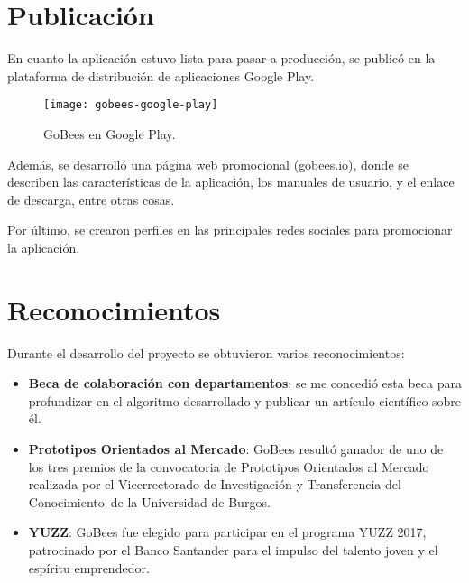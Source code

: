 \section{Publicación}\label{publicacion}

En cuanto la aplicación estuvo lista para pasar a producción, se publicó
en la plataforma de distribución de aplicaciones Google Play.

\begin{figure}[H]
		\centering
	\texttt{[image: gobees-google-play]}
	\caption{GoBees en Google Play.}\label{fig:gobees-google-play}
\end{figure}

Además, se desarrolló una página web promocional
(\href{http://gobees.io/}{gobees.io}), donde se describen las
características de la aplicación, los manuales de usuario, y el enlace
de descarga, entre otras cosas.

Por último, se crearon perfiles en las principales redes sociales para
promocionar la aplicación.

\section{Reconocimientos}\label{reconocimientos}

Durante el desarrollo del proyecto se obtuvieron varios reconocimientos:

\begin{itemize}
\tightlist
\item
  \textbf{Beca de colaboración con departamentos}: se me concedió esta
  beca para profundizar en el algoritmo desarrollado y publicar un
  artículo científico sobre él.
\item
  \textbf{Prototipos Orientados al Mercado}: GoBees resultó ganador de
  uno de los tres premios de la convocatoria de Prototipos Orientados al
  Mercado realizada por el Vicerrectorado de Investigación y
  Transferencia del Conocimiento~de la Universidad de Burgos.
\item
  \textbf{YUZZ}: GoBees fue elegido para participar en el programa YUZZ
  2017, patrocinado por el Banco Santander para el impulso del talento
  joven y el espíritu emprendedor.
\end{itemize}
